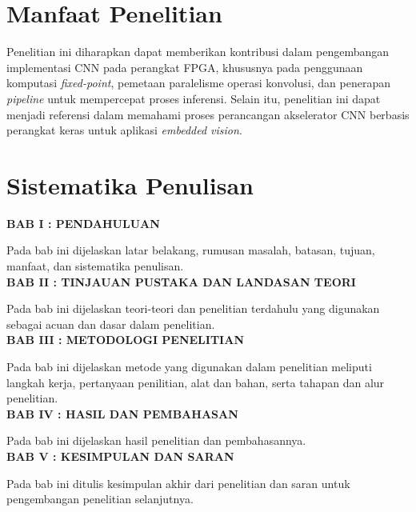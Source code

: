 \section{Manfaat Penelitian}
Penelitian ini diharapkan dapat memberikan kontribusi dalam pengembangan implementasi CNN pada perangkat FPGA, khususnya pada penggunaan komputasi \emph{fixed-point}, pemetaan paralelisme operasi konvolusi, dan penerapan \emph{pipeline} untuk mempercepat proses inferensi. Selain itu, penelitian ini dapat menjadi referensi dalam memahami proses perancangan akselerator CNN berbasis perangkat keras untuk aplikasi \emph{embedded vision}.

\section{Sistematika Penulisan}
\noindent
\textbf{BAB I : PENDAHULUAN}

Pada bab ini dijelaskan latar belakang, rumusan masalah, batasan, tujuan, manfaat, dan sistematika penulisan.\\

\noindent
\textbf{BAB II : TINJAUAN PUSTAKA DAN LANDASAN TEORI}

Pada bab ini dijelaskan teori-teori dan penelitian terdahulu yang digunakan sebagai acuan dan dasar dalam penelitian.\\

\noindent
\textbf{BAB III : METODOLOGI PENELITIAN}

Pada bab ini dijelaskan metode yang digunakan dalam penelitian meliputi langkah kerja, pertanyaan penilitian, alat dan bahan, serta tahapan dan alur penelitian.\\

\noindent
\textbf{BAB IV : HASIL DAN PEMBAHASAN}

Pada bab ini dijelaskan hasil penelitian dan pembahasannya.\\

\noindent
\textbf{BAB V : KESIMPULAN DAN SARAN}

Pada bab ini ditulis kesimpulan akhir dari penelitian dan saran untuk pengembangan penelitian selanjutnya.\\

